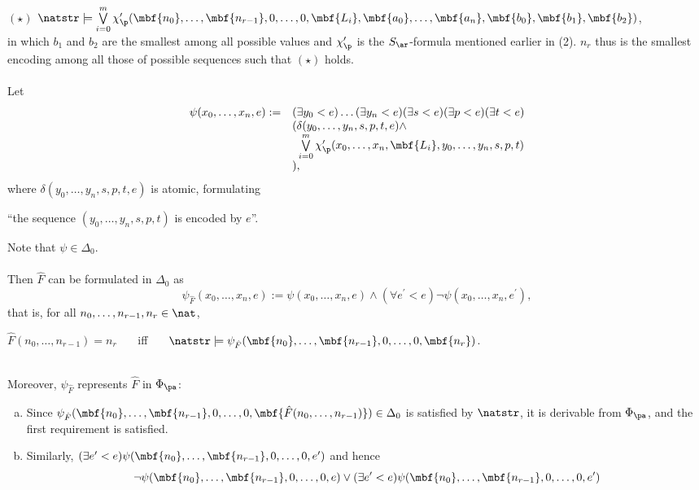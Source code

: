 \begin{enumerate}[(1)]
$(\star)$ \hfill $\natstr \models \bigvee\limits^m_{i = 0} \chi_\p^\prime(\mbf{n_0}, \ldots, \mbf{n_{r - 1}}, 0, \ldots, 0, \mbf{L_i}, \mbf{a_0}, \ldots, \mbf{a_n}, \mbf{b_0}, \mbf{b_1}, \mbf{b_2})$, \hfill \phantom{$(\star)$}\\
in which $b_1$ and $b_2$ are the smallest among all possible values and $\chi_\p^\prime$ is the $S_\ar$-formula mentioned earlier in (2). $n_r$ thus is the smallest encoding among all those of possible sequences such that $(\star)$ holds.\\
\ \\
Let
\[
\begin{array}{ll}
\psi(x_0, \ldots, x_n, e) := & (\exists y_0 < e)\ldots(\exists y_n < e)(\exists s < e)(\exists p < e)(\exists t < e) \cr
\ & (\delta (y_0, \ldots, y_n, s, p, t, e) \land \cr
\ & \phantom{(}\textstyle\bigvee\limits^m_{i = 0} \chi_\p^\prime(x_0, \ldots, x_n, \mbf{L_i}, y_0, \ldots, y_n, s, p, t) \cr
\ & ),
\end{array}
\]
where $\delta (y_0, \ldots, y_n, s, p, t, e)$ is atomic, formulating
\begin{center}
``the sequence $(y_0, \ldots, y_n, s, p, t)$ is encoded by $e$''.
\end{center}
Note that $\psi \in \Delta_0$.\\
\ \\
Then $\hat{F}$ can be formulated in $\Delta_0$ as
\[
\psi_{\hat{F}}(x_0, \ldots, x_n, e) := \psi(x_0, \ldots, x_n, e) \land (\forall e^\prime < e)\neg\psi(x_0, \ldots, x_n, e^\prime),
\]
that is, for all $n_0, \ldots, n_{r - 1}, n_r \in \nat$,
\begin{center}
$\hat{F}(n_0, \ldots, n_{r - 1}) = n_r$ \ \ \ iff \ \ \ $\natstr \models \psi_{\hat{F}}(\mbf{n_0}, \ldots, \mbf{n_{r - 1}}, 0, \ldots, 0, \mbf{n_r})$.
\end{center}
\ \\
Moreover, $\psi_{\hat{F}}$ represents $\hat{F}$ in $\Phi_\pa$:
\begin{enumerate}[(a)]
\item Since $\psi_{\hat{F}}(\mbf{n_0}, \ldots, \mbf{n_{r - 1}}, 0, \ldots, 0, \mbf{\hat{F}(n_0, \ldots, n_{r - 1})}) \in \Delta_0$ is satisfied by $\natstr$, it is derivable from $\Phi_\pa$, and the first requirement is satisfied.
\item Similarly, $(\exists e^\prime < e) \psi(\mbf{n_0}, \ldots, \mbf{n_{r - 1}}, 0, \ldots, 0, e^\prime)$ and hence 
\[
\neg\psi(\mbf{n_0}, \ldots, \mbf{n_{r - 1}}, 0, \ldots, 0, e) \lor (\exists e^\prime < e) \psi(\mbf{n_0}, \ldots, \mbf{n_{r - 1}}, 0, \ldots, 0, e^\prime)
\]
\end{enumerate}
\end{enumerate}
